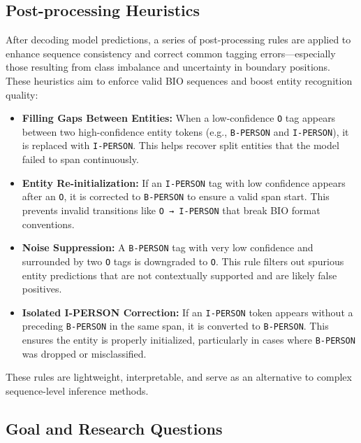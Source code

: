 \documentclass[a4paper]{usiinfbachelorproject}
\begin{document}
\subsection{Post-processing Heuristics}

After decoding model predictions, a series of post-processing rules are applied to enhance sequence consistency and correct common tagging errors—especially those resulting from class imbalance and uncertainty in boundary positions. These heuristics aim to enforce valid BIO sequences and boost entity recognition quality:

\begin{itemize}
    \item \textbf{Filling Gaps Between Entities:} When a low-confidence \texttt{O} tag appears between two high-confidence entity tokens (e.g., \texttt{B-PERSON} and \texttt{I-PERSON}), it is replaced with \texttt{I-PERSON}. This helps recover split entities that the model failed to span continuously.

    \item \textbf{Entity Re-initialization:} If an \texttt{I-PERSON} tag with low confidence appears after an \texttt{O}, it is corrected to \texttt{B-PERSON} to ensure a valid span start. This prevents invalid transitions like \texttt{O → I-PERSON} that break BIO format conventions.

    \item \textbf{Noise Suppression:} A \texttt{B-PERSON} tag with very low confidence and surrounded by two \texttt{O} tags is downgraded to \texttt{O}. This rule filters out spurious entity predictions that are not contextually supported and are likely false positives.

    \item \textbf{Isolated I-PERSON Correction:} If an \texttt{I-PERSON} token appears without a preceding \texttt{B-PERSON} in the same span, it is converted to \texttt{B-PERSON}. This ensures the entity is properly initialized, particularly in cases where \texttt{B-PERSON} was dropped or misclassified.

\end{itemize}

These rules are lightweight, interpretable, and serve as an alternative to complex sequence-level inference methods.

\subsection{Goal and Research Questions}
\end{document}
